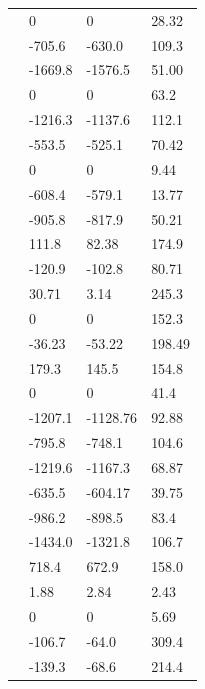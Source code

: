 \tabletail{\hline}
\twocolumn
\tiny
\begin{supertabular}{llll}
     & 0 & 0 & 28.32 \\
     & -705.6 & -630.0 & 109.3 \\
     & -1669.8 & -1576.5 & 51.00 \\
     & 0 & 0 & 63.2 \\
     & -1216.3 & -1137.6 & 112.1 \\
     & -553.5 & -525.1 & 70.42 \\
     & 0 & 0 & 9.44 \\
     & -608.4 & -579.1 & 13.77 \\
     & -905.8 & -817.9 & 50.21 \\
     & 111.8 & 82.38 & 174.9 \\
     & -120.9 & -102.8 & 80.71 \\
     & 30.71 & 3.14 & 245.3 \\
     & 0 & 0 & 152.3 \\
     & -36.23 & -53.22 & 198.49 \\
     & 179.3 & 145.5 & 154.8 \\
     & 0 & 0 & 41.4 \\
     & -1207.1 & -1128.76 & 92.88 \\
     & -795.8 & -748.1 & 104.6 \\
     & -1219.6 & -1167.3 & 68.87 \\
     & -635.5 & -604.17 & 39.75 \\
     & -986.2 & -898.5 & 83.4 \\
     & -1434.0 & -1321.8 & 106.7 \\
     & 718.4 & 672.9 & 158.0 \\
     & 1.88 & 2.84 & 2.43 \\
     & 0 & 0 & 5.69 \\
     & -106.7 & -64.0 & 309.4 \\
     & -139.3 & -68.6 & 214.4 \\

\end{supertabular}
